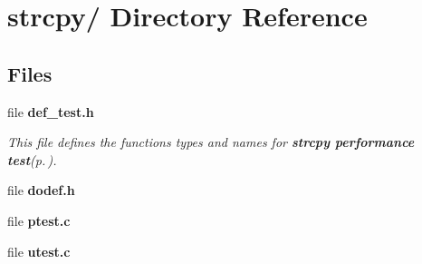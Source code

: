 \section{strcpy/ Directory Reference}
\label{dir_000007}
\subsection*{Files}
\begin{CompactItemize}
\item 
file {\bf def\_\-test.h}
\begin{CompactList}\small\item\em This file defines the functions types and names for {\bf strcpy performance test}{\rm (p.\,\pageref{group__strcpy__test})}. \item\end{CompactList}

\item 
file {\bf dodef.h}
\item 
file {\bf ptest.c}
\item 
file {\bf utest.c}
\end{CompactItemize}
